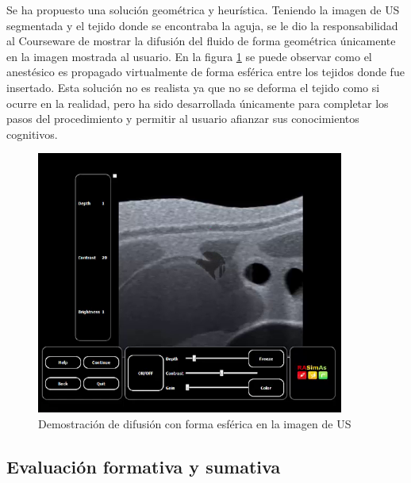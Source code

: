 
Se ha propuesto una solución geométrica y heurística. Teniendo la imagen de \ac{US} segmentada y el tejido donde se encontraba la aguja, se le dio la responsabilidad al \ac{Courseware} de mostrar la difusión del fluido de forma geométrica únicamente en la imagen mostrada al usuario. En la figura \ref{fig:spread2} se puede observar como el anestésico es propagado virtualmente de forma esférica entre los tejidos donde fue insertado. Esta solución no es realista ya que no se deforma el tejido como si ocurre en la realidad, pero ha sido desarrollada únicamente para completar los pasos del procedimiento y permitir al usuario afianzar sus conocimientos cognitivos.

\begin{figure}[h]
    \centering
    \includegraphics[width=0.9\textwidth]{IMG/difussion.png}
    \caption{Demostración de difusión con forma esférica en la imagen de \ac{US}}
    \label{fig:spread2}
\end{figure}

 



\subsection{Evaluación formativa y sumativa}
\label{course:feedback}

